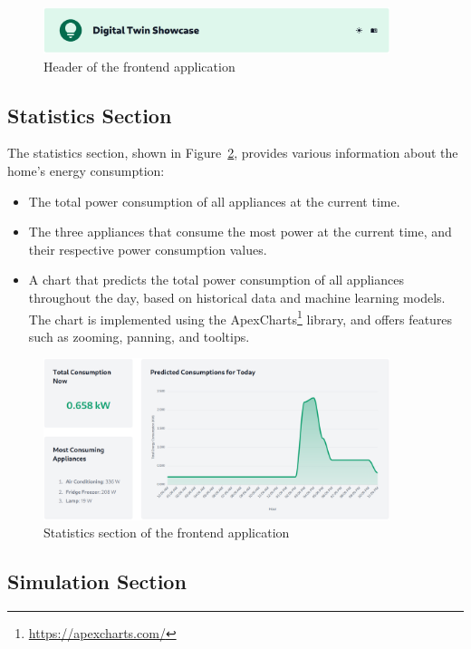 \begin{figure}
    \centering
    \includegraphics[width=0.9\textwidth]{images/frontend/header.png}
    \caption{Header of the frontend application}%
    \label{fig:frontend_header}
\end{figure}

\subsection{Statistics Section}

The statistics section, shown in Figure~\ref{fig:frontend_statistics}, provides various information about the home's energy consumption:
\begin{itemize}
    \item The total power consumption of all appliances at the current time.
    \item The three appliances that consume the most power at the current time, and their respective power consumption values.
    \item A chart that predicts the total power consumption of all appliances throughout the day, based on historical data and machine learning models. The chart is implemented using the ApexCharts\footnote{\url{https://apexcharts.com/}} library, and offers features such as zooming, panning, and tooltips.
\end{itemize}

\begin{figure}
    \centering
    \includegraphics[width=0.9\textwidth]{images/frontend/statistics.png}
    \caption{Statistics section of the frontend application}%
    \label{fig:frontend_statistics}
\end{figure}

\subsection{Simulation Section}

